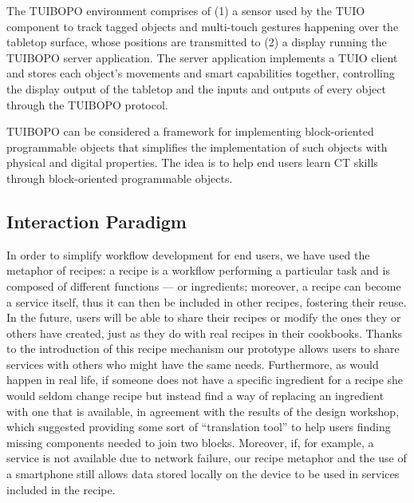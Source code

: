 The TUIBOPO environment comprises of (1) a sensor used by the TUIO component to track tagged objects and multi-touch gestures happening over the tabletop surface, whose positions are transmitted to (2) a display running the TUIBOPO server application. The server application implements a TUIO client and stores each object’s movements and smart capabilities together, controlling the display output of the tabletop and the inputs and outputs of every object through the TUIBOPO protocol. 

TUIBOPO can be considered a framework for implementing block-oriented programmable objects that simplifies the implementation of such objects with physical and digital properties. The idea is to help end users learn CT skills through block-oriented programmable objects.

\subsection{Interaction Paradigm}
In order to simplify workflow development for end users, we have used the metaphor of recipes: a recipe is a workflow performing a particular task and is composed of different functions --- or ingredients; moreover, a recipe can become a service itself, thus it can then be included in other recipes, fostering their reuse. In the future, users will be able to share their recipes or modify the ones they or others have created, just as they do with real recipes in their cookbooks. Thanks to the introduction of this recipe mechanism our prototype allows users to share services with others who might have the same needs. Furthermore, as would happen in real life, if someone does not have a specific ingredient for a recipe she would seldom change recipe but instead find a way of replacing an ingredient with one that is available, in agreement with the results of the design workshop, which suggested providing some sort of ``translation tool'' to help users finding missing components needed to join two blocks. Moreover, if, for example, a service is not available due to network failure, our recipe metaphor and the use of a smartphone still allows data stored locally on the device to be used in services
included in the recipe.

